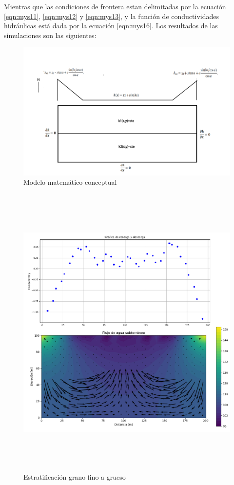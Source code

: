 Mientras que las condiciones de frontera estan delimitadas por la ecuación \ref{eqn:mys11}, \ref{eqn:mys12} y \ref{eqn:mys13}, y la función de conductividades hidráulicas está dada por la ecuación \ref{eqn:mys16}. Los resultados de las simulaciones son las siguientes:

\begin{figure}[H]
\centering
\includegraphics[scale=0.22]{Figura_29b.png}
\caption{ Modelo matemático conceptual}
\label{Figura3:7a}
\end{figure}

\newpage

\vspace*{20mm}
\begin{figure}[h]
\centering
\includegraphics[height=15cm]{Figura_35d.png}
\caption{ Estratificación grano fino a grueso}
\label{Figura3:7}
\end{figure}

